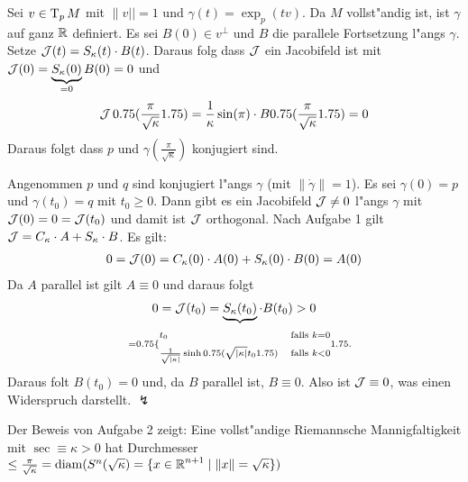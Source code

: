 \begin{Loes}\begin{description}[leftmargin=*]
\item[$\bm{k > 0}$:]
	Sei $v \in \operatorname{T}_pM$ mit $\|v|| = 1$ und $\gamma(t) = \exp_p(tv)$.
	Da $M$ vollst"andig ist, ist $\gamma$ auf ganz $\operatorname{\mathbb{R}}$ definiert.
	Es sei $B(0) \in v^\perp$ und $B$ die parallele Fortsetzung l"angs $\gamma$.
	Setze $\operatorname{\mathcal{J}}(t) = S_\kappa(t) \cdot B(t)$.
	Daraus folg dass $\operatorname{\mathcal{J}}$ ein Jacobifeld ist mit $\operatorname{\mathcal{J}}(0) = \underbrace{S_\kappa(0)}_{=0} B(0) = 0$ und
	\begin{align*}
		\operatorname{\mathcal{J}} 0.75( \frac{\pi}{\sqrt\kappa} 1.75) = \frac{1}{\kappa} \sin(\pi) \cdot B 0.75( \frac{\pi}{\sqrt\kappa} 1.75) = 0
	\end{align*}
	Daraus folgt dass $p$ und $\gamma(\frac{\pi}{\sqrt\kappa})$ konjugiert sind.
\item[$\bm{k \le 0}$:]
	Angenommen $p$ und $q$ sind konjugiert l"angs $\gamma$ (mit $\|\dot\gamma\| = 1$).
	Es sei $\gamma(0) = p$ und $\gamma(t_0) = q$ mit $t_0 \ge 0$.
	Dann gibt es ein Jacobifeld $\operatorname{\mathcal{J}} \ne 0$ l"angs $\gamma$ mit $\operatorname{\mathcal{J}}(0) = 0 = \operatorname{\mathcal{J}}(t_0)$ und damit ist $\operatorname{\mathcal{J}}$ orthogonal.
	Nach Aufgabe 1 gilt $\operatorname{\mathcal{J}} = C_\kappa \cdot A + S_\kappa \cdot B$. Es gilt:
	\begin{align*}
		0 = \operatorname{\mathcal{J}}(0) = C_\kappa(0) \cdot A(0) + S_\kappa(0) \cdot B(0) = A(0)
	\end{align*}
	Da $A$ parallel ist gilt $A \equiv 0$ und daraus folgt
	\begin{align*}
		0 = \calJ(t_0) = \underbrace{S_\kappa(t_0)}_{\mathclap{= \begin{cases} \scriptstyle{t_0} & \scriptsize{\text{falls }} \scriptstyle{k = 0} \\ \scriptstyle{\frac{1}{\sqrt{|\kappa|}} \sinh\left(\sqrt{|\kappa|}t_0\right)} & \scriptsize{\text{falls }} \scriptstyle{k < 0} \end{cases}}} \cdot B(t_0) > 0
	\end{align*}
	Daraus folt $B(t_0) = 0$ und, da $B$ parallel ist, $B \equiv 0$.
	Also ist $\operatorname{\mathcal{J}} \equiv 0$, was einen Widerspruch darstellt. $\lightning$
\end{description}\end{Loes}

\begin{bem}
Der Beweis von Aufgabe 2 zeigt:
Eine vollst"andige Riemannsche Mannigfaltigkeit mit $\sec \equiv \kappa > 0$ hat Durchmesser $\le \frac{\pi}{\sqrt\kappa} = \operatorname{diam}(S^n(\sqrt\kappa) = \{ x \in \operatorname{\mathbb{R}}^{n+1} \mid \|x\| = \sqrt\kappa\})$
\end{bem}


